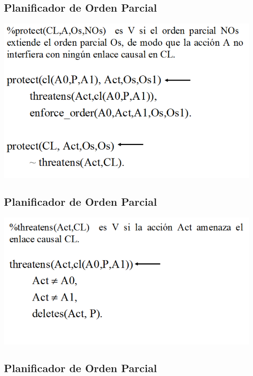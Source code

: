 \documentclass[11pt]{article}
\begin{document}
\subsection*{Planificador de Orden Parcial}
\label{sec:org3613b2b}

\begin{center}
\includegraphics[width=.9\linewidth]{imagenes/Pop6.png}
\end{center}

\subsection*{Planificador de Orden Parcial}
\label{sec:org58d26d8}

\begin{center}
\includegraphics[width=.9\linewidth]{imagenes/Pop7.png}
\end{center}

\subsection*{Planificador de Orden Parcial}
\label{sec:orgc80e6e2}
\end{document}
